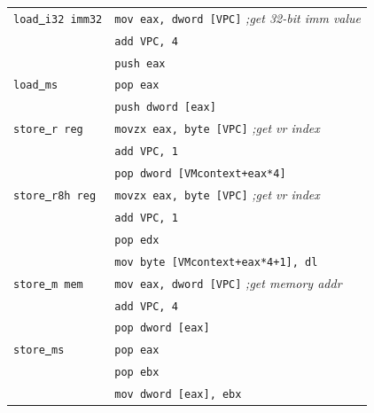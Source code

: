 \begin{table}[]
{\begin{tabular}{|l|l|}
\texttt{load\underline{ }i32 imm32}     & \texttt{mov eax, dword [VPC]} \emph{;get 32-bit imm value}            \\
                & \texttt{add VPC, 4}                  \\
                & \texttt{push eax}                                      \\ \hline
\texttt{load\underline{ }ms}        & \texttt{pop eax}                                       \\
                & \texttt{push dword [eax]}                              \\ \hline
\texttt{store\underline{ }r reg}    & \texttt{movzx eax, byte [VPC]} \emph{;get vr index}     \\
                & \texttt{add VPC, 1}                  \\
                & \texttt{pop dword [VMcontext+eax*4]}                   \\ \hline
\texttt{store\underline{ }r8h reg}  & \texttt{movzx eax, byte [VPC]} \emph{;get vr index}     \\
                & \texttt{add VPC, 1}                  \\
                & \texttt{pop edx}                                       \\
                & \texttt{mov byte [VMcontext+eax*4+1], dl}                \\ \hline
\texttt{store\underline{ }m mem}    & \texttt{mov eax, dword [VPC]} \emph{;get memory addr}               \\
                & \texttt{add VPC, 4}                  \\
                & \texttt{pop dword [eax]}                               \\ \hline
\texttt{store\underline{ }ms}       & \texttt{pop eax}                                       \\
                & \texttt{pop ebx}                                       \\
                & \texttt{mov dword [eax], ebx}                          \\ \hline
\end{tabular}
}
\begin{tabnote}
\end{tabnote}
\end{table}


